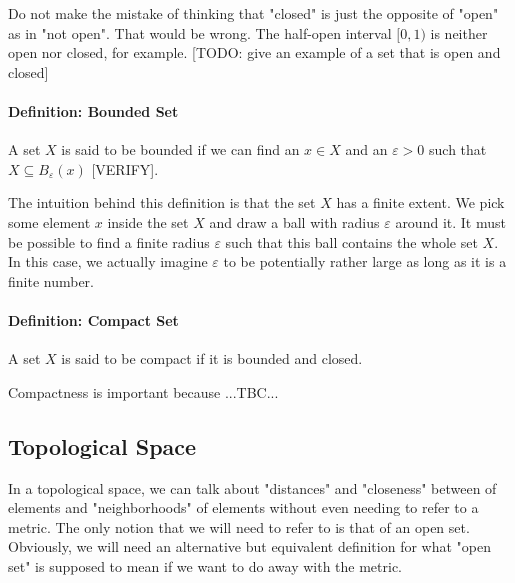 \medskip
Do not make the mistake of thinking that "closed" is just the opposite of "open" as in "not open". That would be wrong. The half-open interval $[0,1)$ is neither open nor closed, for example. [TODO: give an example of a set that is open and closed]

\paragraph{Definition: Bounded Set} A set $X$ is said to be bounded if we can find an $x \in X$ and an $\varepsilon > 0$ such that $X \subseteq B_\varepsilon(x)$ [VERIFY]. 

\medskip
The intuition behind this definition is that the set $X$ has a finite extent. We pick some element $x$ inside the set $X$ and draw a ball with radius $\varepsilon$ around it. It must be possible to find a finite radius $\varepsilon$ such that this ball contains the whole set $X$. In this case, we actually imagine $\varepsilon$ to be potentially rather large as long as it is a finite number.

\paragraph{Definition: Compact Set} A set $X$ is said to be compact if it is bounded and closed.

\medskip
Compactness is important because ...TBC...







\subsection{Topological Space}
In a topological space, we can talk about "distances" and "closeness" between of elements and "neighborhoods" of elements without even needing to refer to a metric. The only notion that we will need to refer to is that of an open set. Obviously, we will need an alternative but equivalent definition for what "open set" is supposed to mean if we want to do away with the metric.



